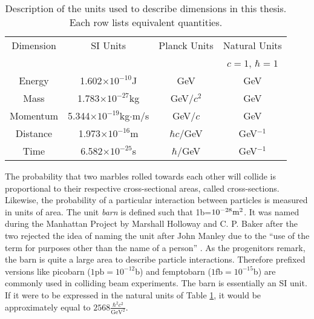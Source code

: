 \begin{table}[htp]
\caption{Description of the units used to describe dimensions in this thesis. Each row lists equivalent quantities.}
\begin{center}
\begin{tabular}{c c c c}
\toprule
Dimension & SI Units &  Planck Units & Natural Units \\
          &          &               & $c=1$, $\hbar = 1$ \\
\midrule
Energy    &    1.602$\times10^{-10}$J               & GeV            & GeV \\
Mass      &    1.783$\times10^{-27}$kg              & GeV/$c^2$      & GeV \\
Momentum  &    5.344$\times10^{-19}$kg$\cdot$m/s    & GeV/$c$        & GeV \\
Distance  &    1.973$\times10^{-16}$m               & $\hbar c/$GeV  & GeV$^{-1}$ \\
Time      &    6.582$\times10^{-25}$s               & $\hbar/$GeV    & GeV$^{-1}$ \\
\bottomrule
\end{tabular}
\label{tab:units}
\end{center}
\end{table}

The probability that two marbles rolled towards each other will collide is proportional to their respective cross-sectional areas, called cross-sections.
Likewise, the probability of a particular interaction between particles is measured in units of area.
The unit \emph{barn} is defined such that 1b=$10^{-28}\text m^2$.
It was named during the Manhattan Project by Marshall Holloway and C. P. Baker after the two rejected the idea of naming the unit after John Manley due to the ``use of the term for purposes other than the name of a person'' \cite{holloway}.
As the progenitors remark, the barn is quite a large area to describe particle interactions.
Therefore prefixed versions like picobarn ($1\text{pb}=10^{-12}$b) and femptobarn ($1\text{fb}=10^{-15}$b) are commonly used in colliding beam experiments.
The barn is essentially an SI unit. If it were to be expressed in the natural units of Table \ref{tab:units}, it would be approximately equal to $2568\frac{\hbar^2 c^2}{\text{GeV}^2}$.


